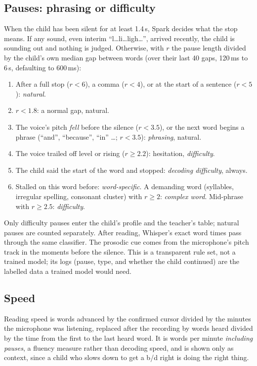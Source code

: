 \documentclass[manuscript, screen, review, anonymous]{acmart}
\begin{document}
\subsection{Pauses: phrasing or difficulty}
\label{sec:pause}
When the child has been silent for at least 1.4\,s, Spark decides what the stop means. If any sound, even interim ``l\ldots li\ldots ligh\ldots'', arrived recently, the child is sounding out and nothing is judged. Otherwise, with $r$ the pause length divided by the child's own median gap between words (over their last 40 gaps, 120\,ms to 6\,s, defaulting to 600\,ms):
\begin{enumerate}
\item After a full stop ($r<6$), a comma ($r<4$), or at the start of a sentence ($r<5$): \emph{natural}.
\item $r<1.8$: a normal gap, natural.
\item The voice's pitch \emph{fell} before the silence ($r<3.5$), or the next word begins a phrase (``and'', ``because'', ``in'' \ldots; $r<3.5$): \emph{phrasing}, natural.
\item The voice trailed off level or rising ($r\ge 2.2$): hesitation, \emph{difficulty}.
\item The child said the start of the word and stopped: \emph{decoding difficulty}, always.
\item Stalled on this word before: \emph{word-specific}. A demanding word (syllables, irregular spelling, consonant cluster) with $r\ge2$: \emph{complex word}. Mid-phrase with $r\ge2.5$: \emph{difficulty}.
\end{enumerate}
Only difficulty pauses enter the child's profile and the teacher's table; natural pauses are counted separately. After reading, Whisper's exact word times pass through the same classifier. The prosodic cue comes from the microphone's pitch track in the moments before the silence. This is a transparent rule set, not a trained model; its logs (pause, type, and whether the child continued) are the labelled data a trained model would need.

\subsection{Speed}
Reading speed is words advanced by the confirmed cursor divided by the minutes the microphone was listening, replaced after the recording by words heard divided by the time from the first to the last heard word. It is words per minute \emph{including pauses}, a fluency measure rather than decoding speed, and is shown only as context, since a child who slows down to get a b/d right is doing the right thing.
\end{document}
